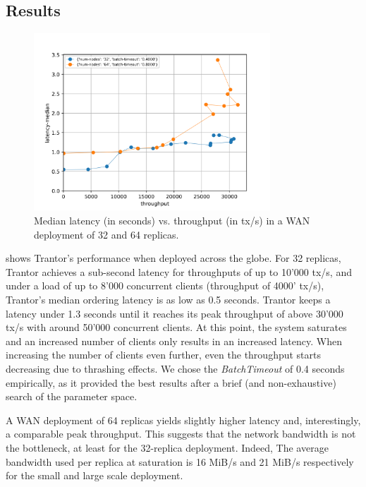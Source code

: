 \documentclass{article}
\begin{document}
\subsection{Results}

\begin{figure}
    \centering
    \includegraphics[width=0.79\textwidth]{figures/results-wan-final.png}
    \caption{\centering Median latency (in seconds) vs. throughput (in tx/s)\newline
    in a WAN deployment of 32 and 64 replicas.}
    \label{fig:eval-wan}
\end{figure}

 shows Trantor's performance when deployed across the globe.
For 32 replicas, Trantor achieves a sub-second latency for throughputs of up to 10'000 tx/s,
and under a load of up to 8'000 concurrent clients (throughput of 4000' tx/s), Trantor's median ordering latency is as low as 0.5 seconds.
Trantor keeps a latency under 1.3 seconds until it reaches its peak throughput of above 30'000 tx/s with around 50'000 concurrent clients.
At this point, the system saturates and an increased number of clients only results in an increased latency.
When increasing the number of clients even further, even the throughput starts decreasing due to thrashing effects.
We chose the \textit{BatchTimeout} of 0.4 seconds empirically,
as it provided the best results after a brief (and non-exhaustive) search of the parameter space.

A WAN deployment of 64 replicas yields slightly higher latency and, interestingly, a comparable peak throughput.
This suggests that the network bandwidth is not the bottleneck, at least for the 32-replica deployment.
Indeed, The average bandwidth used per replica at saturation is 16 MiB/s and 21 MiB/s respectively for the small and large scale deployment.
\end{document}
